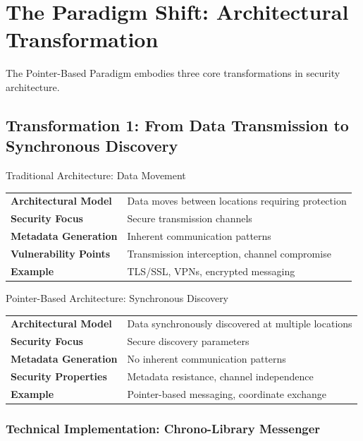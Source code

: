 \documentclass[11pt,a4paper]{article}
\begin{document}
\section{The Paradigm Shift: Architectural Transformation}

The Pointer-Based Paradigm embodies three core transformations in security architecture.

\subsection{Transformation 1: From Data Transmission to Synchronous Discovery}

\begin{paradigmbox}{Traditional Architecture: Data Movement}
\begin{tabularx}{\textwidth}{lX}
\textbf{Architectural Model} & Data moves between locations requiring protection \\
\textbf{Security Focus} & Secure transmission channels \\
\textbf{Metadata Generation} & Inherent communication patterns \\
\textbf{Vulnerability Points} & Transmission interception, channel compromise \\
\textbf{Example} & TLS/SSL, VPNs, encrypted messaging \\
\end{tabularx}
\end{paradigmbox}

\begin{paradigmbox}{Pointer-Based Architecture: Synchronous Discovery}
\begin{tabularx}{\textwidth}{lX}
\textbf{Architectural Model} & Data synchronously discovered at multiple locations \\
\textbf{Security Focus} & Secure discovery parameters \\
\textbf{Metadata Generation} & No inherent communication patterns \\
\textbf{Security Properties} & Metadata resistance, channel independence \\
\textbf{Example} & Pointer-based messaging, coordinate exchange \\
\end{tabularx}
\end{paradigmbox}

\subsubsection{Technical Implementation: Chrono-Library Messenger}
\end{document}
